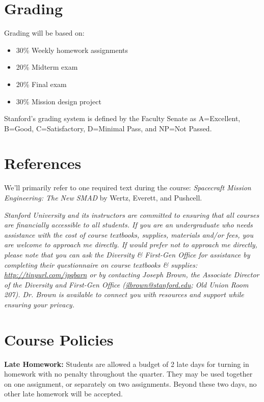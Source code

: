 \documentclass[11pt,letterpaper]{article}
\begin{document}
\section*{Grading}

Grading will be based on:
\begin{itemize}
	\item 30\% Weekly homework assignments
	\item 20\% Midterm exam
	\item 20\% Final exam
	\item 30\% Mission design project
\end{itemize}
Stanford's grading system is defined by the Faculty Senate as A=Excellent, B=Good, C=Satisfactory, D=Minimal Pass, and NP=Not Passed.

\section*{References}

We'll primarily refer to one required text during the course: \textit{Spacecraft Mission Engineering: The New SMAD} by Wertz, Everett, and Pushcell.

\medskip
\noindent
\emph{Stanford University and its instructors are committed to ensuring that all courses are financially accessible to all students. If you are an undergraduate who needs assistance with the cost of course textbooks, supplies, materials and/or fees, you are welcome to approach me directly. If would prefer not to approach me directly, please note that you can ask the Diversity \& First-Gen Office for assistance by completing their questionnaire on course textbooks \& supplies: \href{http://tinyurl.com/jpqbarn}{http://tinyurl.com/jpqbarn} or by contacting Joseph Brown, the Associate Director of the Diversity and First-Gen Office (\href{mailto:jlbrown@stanford.edu}{jlbrown@stanford.edu}; Old Union Room 207). Dr. Brown is available to connect you with resources and support while ensuring your privacy.}

\section*{Course Policies}

\textbf{Late Homework:} Students are allowed a budget of 2 late days for turning in homework with no penalty throughout the quarter. They may be used together on one assignment, or separately on two assignments. Beyond these two days, no other late homework will be accepted.
\end{document}

